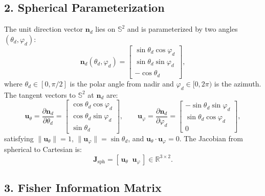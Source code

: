 \documentclass[journal]{IEEEtran}
\begin{document}
\subsection*{2. Spherical Parameterization}

The unit direction vector $\mathbf{n}_d$ lies on $\mathbb{S}^2$ and is 
parameterized by two angles $(\theta_d, \varphi_d)$:
\begin{equation}
  \mathbf{n}_d(\theta_d,\varphi_d) = 
  \begin{bmatrix}
    \sin\theta_d\cos\varphi_d \\
    \sin\theta_d\sin\varphi_d \\
    -\cos\theta_d
  \end{bmatrix},
  \label{eq:deb_nd_sph}
\end{equation}
where $\theta_d \in [0,\pi/2]$ is the polar angle from nadir and 
$\varphi_d \in [0,2\pi)$ is the azimuth.  The tangent vectors to 
$\mathbb{S}^2$ at $\mathbf{n}_d$ are:
\begin{equation}
  \mathbf{u}_\theta = \frac{\partial\mathbf{n}_d}{\partial\theta_d}
  = \begin{bmatrix}
      \cos\theta_d\cos\varphi_d \\
      \cos\theta_d\sin\varphi_d \\
      \sin\theta_d
    \end{bmatrix},
  \qquad
  \mathbf{u}_\varphi = \frac{\partial\mathbf{n}_d}{\partial\varphi_d}
  = \begin{bmatrix}
      -\sin\theta_d\sin\varphi_d \\
      \sin\theta_d\cos\varphi_d \\
      0
    \end{bmatrix},
  \label{eq:deb_tangent}
\end{equation}
satisfying $\|\mathbf{u}_\theta\|=1$, 
$\|\mathbf{u}_\varphi\|=\sin\theta_d$, and 
$\mathbf{u}_\theta \cdot \mathbf{u}_\varphi = 0$.
The Jacobian from spherical to Cartesian is:
\begin{equation}
  \mathbf{J}_{\mathrm{sph}} 
  = [\,\mathbf{u}_\theta \;\; \mathbf{u}_\varphi\,]
  \in \mathbb{R}^{3\times 2}.
  \label{eq:deb_Jsph}
\end{equation}

\subsection*{3. Fisher Information Matrix}
\end{document}
